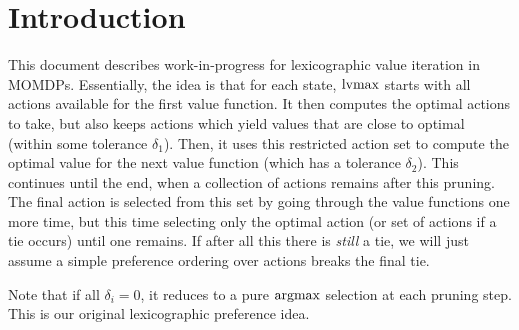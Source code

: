 \section{Introduction}
\label{sec:introduction}

This document describes work-in-progress for lexicographic value iteration in MOMDPs. Essentially, the idea is that for each state, $\operatorname*{lvmax}$ starts with all actions available for the first value function. It then computes the optimal actions to take, but also keeps actions which yield values that are close to optimal (within some tolerance $\delta_1$). Then, it uses this restricted action set to compute the optimal value for the next value function (which has a tolerance $\delta_2$). This continues until the end, when a collection of actions remains after this pruning. The final action is selected from this set by going through the value functions one more time, but this time selecting only the optimal action (or set of actions if a tie occurs) until one remains. If after all this there is \emph{still} a tie, we will just assume a simple preference ordering over actions breaks the final tie.

Note that if all $\delta_i = 0$, it reduces to a pure $\operatorname*{argmax}$ selection at each pruning step. This is our original lexicographic preference idea.
